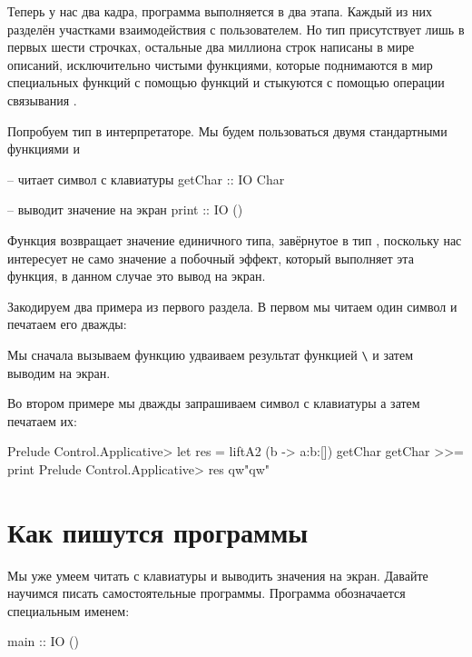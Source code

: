 Теперь у нас два кадра, программа выполняется в два этапа. Каждый из них
разделён участками взаимодействия с пользователем. Но тип 
присутствует лишь в первых шести строчках, остальные два миллиона строк
написаны в мире описаний, исключительно чистыми функциями, которые
поднимаются в мир специальных функций с помощью функций  и
стыкуются с помощью операции связывания \In{>>=}.

Попробуем тип  в интерпретаторе. Мы будем пользоваться двумя
стандартными функциями  и 


\begin{code}
-- читает символ с клавиатуры
getChar :: IO Char

-- выводит значение на экран
print :: IO ()
\end{code}

Функция  возвращает значение единичного типа, завёрнутое в тип
, поскольку нас интересует не само значение а побочный эффект,
который выполняет эта функция, в данном случае это вывод на экран.

Закодируем два примера из первого раздела. В первом мы читаем один
символ и печатаем его дважды:



Мы сначала вызываем функцию  удваиваем результат функцией
\In{}\verb!\! и затем выводим на экран.

Во втором примере мы дважды запрашиваем символ с клавиатуры а затем
печатаем их:


\begin{code}
Prelude Control.Applicative> let res = liftA2 (\a b -> a:b:[]) getChar getChar >>= print
Prelude Control.Applicative> res
qw"qw"
\end{code}

\section{Как пишутся программы}

Мы уже умеем читать с клавиатуры и выводить значения на экран. Давайте
научимся писать самостоятельные программы. Программа обозначается
специальным именем:


\begin{code}
main :: IO ()
\end{code}

